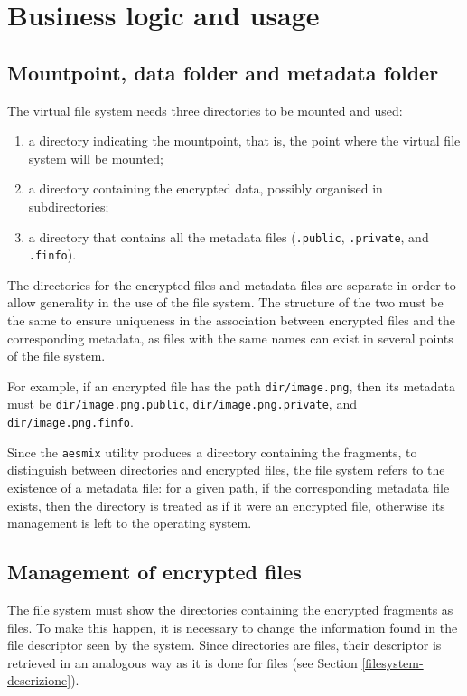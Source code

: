 \documentclass[a4paper,12pt,twoside,openright]{report}
\begin{document}
  \section{Business logic and usage}

  \subsection{Mountpoint, data folder and metadata folder}

  The virtual file system needs three directories to be mounted and used:
  \begin{enumerate}
    \item a directory indicating the mountpoint, that is, the point where the virtual file system will be mounted;
    \item a directory containing the encrypted data, possibly organised in subdirectories;
    \item a directory that contains all the metadata files (\texttt{.public}, \texttt{.private}, and \texttt{.finfo}).
  \end{enumerate}

  The directories for the encrypted files and metadata files are separate in order to allow generality
  in the use of the file system. The structure of the two must be the same to ensure uniqueness in the
  association between encrypted files and the corresponding metadata, as files with the same names can
  exist in several points of the file system.

  For example, if an encrypted file has the path \texttt{dir/image.png}, then its metadata must be
  \texttt{dir/image.png.public}, \texttt{dir/image.png.private}, and \texttt{dir/image.png.finfo}.

  Since the \texttt{aesmix} utility produces a directory containing the fragments, to distinguish between directories
  and encrypted files, the file system refers to the existence of a metadata file: for a given path,
  if the corresponding metadata file exists, then the directory is treated as if it were an encrypted file, otherwise
  its management is left to the operating system.

  \subsection{Management of encrypted files}
  \label{section-file-criptati}

  The file system must show the directories containing the encrypted fragments as files.
  To make this happen, it is necessary to change the information found in the file descriptor seen by the system.
  Since directories are files, their descriptor is retrieved in an analogous way as it is done for files (see Section \ref{filesystem-descrizione}).
  
\end{document}

